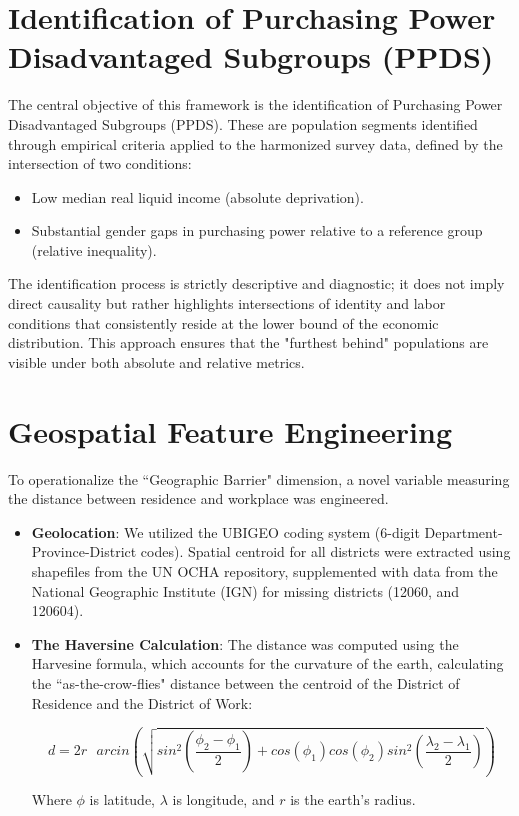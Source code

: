 \documentclass{article}
\begin{document}
\section{Identification of Purchasing Power Disadvantaged Subgroups (PPDS)}
The central objective of this framework is the identification of Purchasing Power Disadvantaged 
Subgroups (PPDS). These are population segments identified through empirical criteria applied 
to the harmonized survey data, defined by the intersection of two conditions:

\begin{itemize}

    \item[(i)] Low median real liquid income (absolute 
    deprivation).

    \item[(ii)] Substantial gender gaps in purchasing 
    power relative to a reference group (relative 
    inequality).

\end{itemize}
 
The identification process is strictly descriptive and diagnostic; it does not imply direct 
causality but rather highlights intersections of identity and labor conditions that consistently 
reside at the lower bound of the economic distribution. This approach ensures that the "furthest 
behind" populations are visible under both absolute and relative metrics.

\section{Geospatial Feature Engineering}
To operationalize the ``Geographic Barrier" dimension, a novel variable measuring the distance 
between residence and workplace was engineered. 

\begin{itemize}

    \item \textbf{Geolocation}: We utilized the UBIGEO 
    coding system (6-digit Department-Province-District 
    codes). Spatial centroid for all districts were 
    extracted using shapefiles from the UN OCHA repository, 
    supplemented with data from the National Geographic 
    Institute (IGN) for missing districts (12060, and 120604).

    \item \textbf{The Haversine Calculation}: The 
    distance was computed using the Harvesine 
    formula, which accounts for the curvature 
    of the earth, calculating the ``as-the-crow-flies" 
    distance between the centroid of the District 
    of Residence and the District of Work:

    \begin{equation*}
        d = 2r\text{ }arcin\left(\sqrt{sin^2\left(\frac{\phi_2-\phi_1}{2}\right) +cos(\phi_1)cos(\phi_2) sin^2\left(\frac{\lambda_2-\lambda_1}{2}\right)}\right)
    \end{equation*}

    Where $\phi$ is latitude, $\lambda$ is longitude, and $r$ 
    is the earth's radius.

\end{itemize}
\end{document}
